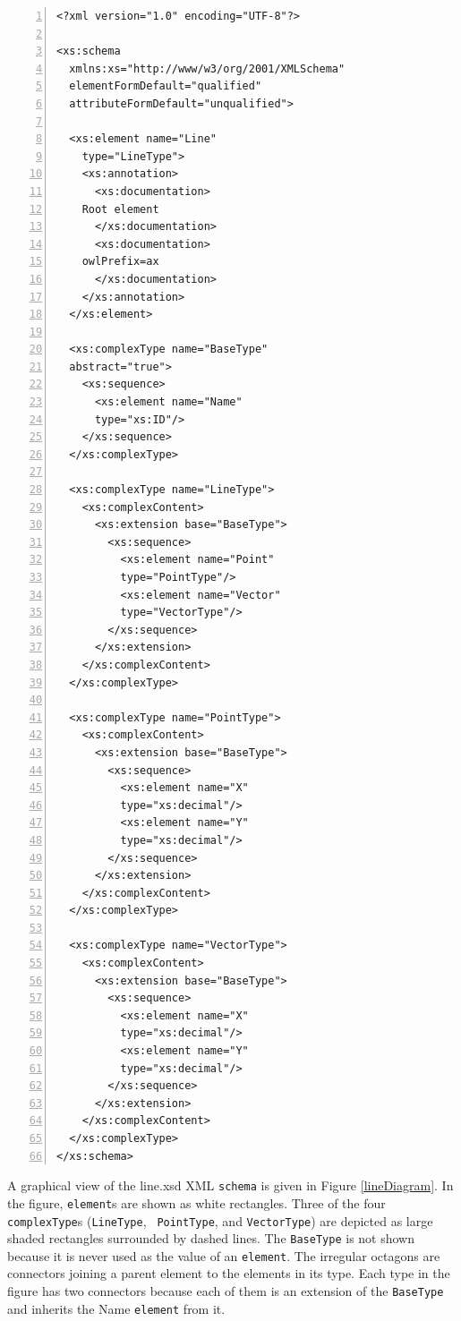 \documentclass[preprint,12pt]{elsarticle}
\newenvironment{mylisting}
{\begin{list}{}{\setlength{\leftmargin}{1em}}\item\small}
{\end{list}}
\begin{document}
\begin{mylisting}
\begin{Verbatim}[commandchars=\\\{\},numbers=left, numbersep=1pt]
<?xml version="1.0" encoding="UTF-8"?>

<xs:schema 
  xmlns:xs="http://www/w3/org/2001/XMLSchema"
  elementFormDefault="qualified"
  attributeFormDefault="unqualified">
  
  <xs:element name="Line" 
    type="LineType">
    <xs:annotation>
      <xs:documentation>
	Root element
      </xs:documentation>
      <xs:documentation>
	owlPrefix=ax
      </xs:documentation>
    </xs:annotation>
  </xs:element>

  <xs:complexType name="BaseType"
  abstract="true">
    <xs:sequence>
      <xs:element name="Name"
      type="xs:ID"/>
    </xs:sequence>
  </xs:complexType>

  <xs:complexType name="LineType">
    <xs:complexContent>
      <xs:extension base="BaseType">
        <xs:sequence>
          <xs:element name="Point"
          type="PointType"/>
          <xs:element name="Vector"
          type="VectorType"/>
        </xs:sequence>
      </xs:extension>
    </xs:complexContent>
  </xs:complexType>

  <xs:complexType name="PointType">
    <xs:complexContent>
      <xs:extension base="BaseType">
        <xs:sequence>
          <xs:element name="X"
          type="xs:decimal"/>
          <xs:element name="Y"
          type="xs:decimal"/>
        </xs:sequence>
      </xs:extension>
    </xs:complexContent>
  </xs:complexType>

  <xs:complexType name="VectorType">
    <xs:complexContent>
      <xs:extension base="BaseType">
        <xs:sequence>
          <xs:element name="X"
          type="xs:decimal"/>
          <xs:element name="Y"
          type="xs:decimal"/>
        </xs:sequence>
      </xs:extension>
    </xs:complexContent>
  </xs:complexType>
</xs:schema>
\end{Verbatim}
\label{schemaFile}
\end{mylisting}


A graphical view of the line.xsd XML {\tt schema} is given in Figure
\ref{lineDiagram}. In the figure, {\tt element}s are shown as white
rectangles. Three of the four {\tt complexType}s ({\tt LineType}, {\tt
  PointType}, and {\tt VectorType}) are depicted as large shaded rectangles
surrounded by dashed lines. The {\tt BaseType} is not shown because it is
never used as the value of an {\tt element}. The irregular octagons are
connectors joining a parent element to the elements in its type. Each type
in the figure has two connectors because each of them is an extension of
the {\tt BaseType} and inherits the Name {\tt element} from it.
\end{document}

